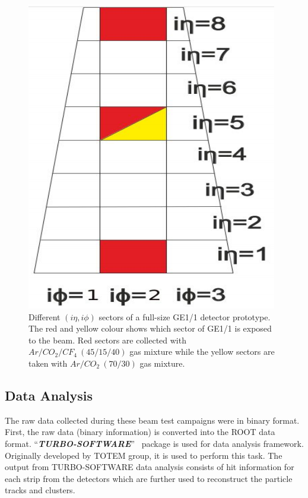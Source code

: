 

\begin{figure}[!htbp]
\centering
\includegraphics[scale=0.5,angle=90]{figures/GEM/GE11.png}
\caption{Different $(i\eta,i\phi)$ sectors of a full-size GE1/1 detector prototype. The red and yellow colour shows which sector of GE1/1 is exposed to the beam. Red sectors are collected with $Ar/CO_2/CF_4~(45/15/40)$ gas mixture while the yellow sectors are taken with $Ar/CO_2~(70/30)$ gas mixture.}
\label{GE1/1}
\end{figure}
\subsection{Data Analysis} %
\label{sub:test_beam_analysis}
The raw data collected during these beam test campaigns were in binary format. First, the raw data (binary information) is converted into the ROOT data format. ``\textit{\textbf{TURBO-SOFTWARE}}''~\cite{git-trubosoftware} package is used for data analysis framework. Originally developed by TOTEM group, it is used to perform this task. The output from TURBO-SOFTWARE data analysis consists of hit information for each strip from the detectors which are further used to reconstruct the particle tracks and clusters. 

